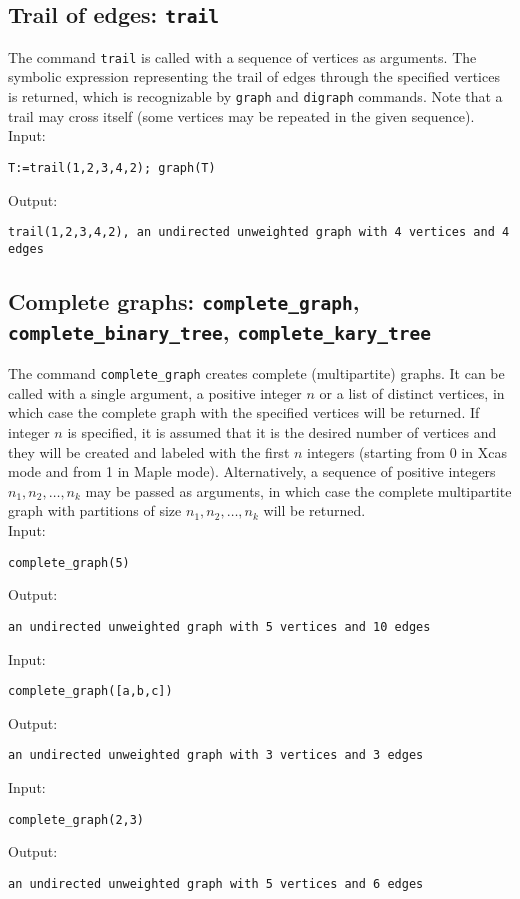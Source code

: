 \documentclass[a4paper,11pt]{article}
\begin{document}
\subsection{Trail of edges: {\tt trail}}

The command {\tt trail} is called with a sequence of vertices as arguments. The symbolic expression representing the trail of edges through the specified vertices is returned, which is recognizable by {\tt graph} and {\tt digraph} commands. Note that a trail may cross itself (some vertices may be repeated in the given sequence).\\
Input:
\begin{center}
  \tt T:=trail(1,2,3,4,2); graph(T)
\end{center}
Output:
\begin{center}
  \tt trail(1,2,3,4,2), an undirected unweighted graph with 4 vertices and 4 edges 
\end{center}

\subsection{Complete graphs: {\tt complete\_graph}, {\tt complete\_binary\_tree}, {\tt complete\_kary\_tree}}

The command {\tt complete\_graph} creates complete (multipartite) graphs. It can be called with a single argument, a positive integer $ n $ or a list of distinct vertices, in which case the complete graph with the specified vertices will be returned. If integer $ n $ is specified, it is assumed that it is the desired number of vertices and they will be created and labeled with the first $ n $ integers (starting from 0 in Xcas mode and from 1 in Maple mode). Alternatively, a sequence of positive integers $ n_1,n_2,\dots,n_k $ may be passed as arguments, in which case the complete multipartite graph with partitions of size $ n_1,n_2,\dots,n_k $ will be returned.\\
Input:
\begin{center}
  \tt complete\_graph(5)
\end{center}
Output:
\begin{center}
  \tt an undirected unweighted graph with 5 vertices and 10 edges
\end{center}
Input:
\begin{center}
  \tt complete\_graph([a,b,c])
\end{center}
Output:
\begin{center}
  \tt an undirected unweighted graph with 3 vertices and 3 edges
\end{center}
Input:
\begin{center}
  \tt complete\_graph(2,3)
\end{center}
Output:
\begin{center}
  \tt an undirected unweighted graph with 5 vertices and 6 edges
\end{center}
\end{document}
